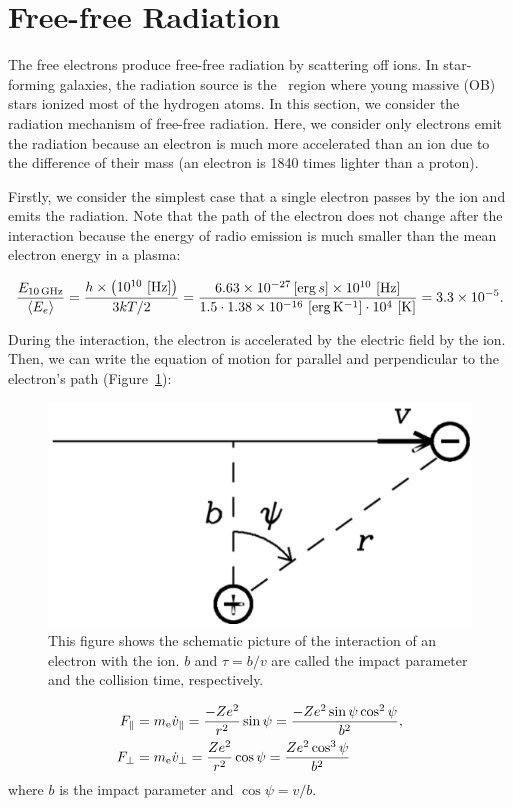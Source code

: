 \section{Free-free Radiation}\label{sec:freefreeradiation}

The free electrons produce free-free radiation by scattering off ions.
In star-forming galaxies, the radiation source is the \ih~region where young massive (OB) stars ionized most of the hydrogen atoms.
In this section, we consider the radiation mechanism of free-free radiation.
Here, we consider only electrons emit the radiation because an electron is much more accelerated than an ion due to the difference of their mass (an electron is 1840 times lighter than a proton).

Firstly, we consider the simplest case that a single electron passes by the ion and emits the radiation.
Note that the path of the electron does not change after the interaction because the energy of radio emission is much smaller than the mean electron energy in a plasma:

\begin{equation}\label{eq:essential_radio4n12}
    \frac{E_{\mathrm{10\,\mathrm{GHz}}}}{\left\langle E_e\right\rangle} = \frac{h \times \left(10^{10}\,\left[\mathrm{Hz}\right]\right)}{3kT / 2} = \frac{6.63 \times 10^{-27} \left[\mathrm{erg}\,s\right] \times 10^{10}\,\left[\mathrm{Hz}\right]}{1.5 \cdot 1.38 \times 10^{-16}\,\left[\mathrm{erg\,K^{-1}}\right] \cdot 10^4\,\left[\mathrm{K}\right]} = 3.3 \times 10^{-5}.
\end{equation}

During the interaction, the electron is accelerated by the electric field by the ion.
Then, we can write the equation of motion for parallel and perpendicular to the electron's path (Figure~\ref{fig:nrao_radio4n2}):

\begin{figure}[htbp]
	\centering
	\includegraphics[width=.5\linewidth]{Chapter_2/Figures/NRAO_radio4n2.png}
    \caption[The schematic image of the interaction of an electron with the ion]{\label{fig:nrao_radio4n2}
        This figure shows the schematic picture of the interaction of an electron with the ion.
        $b$ and $\tau = b/v$ are called the impact parameter and the collision time, respectively.
    }
\end{figure}
\begin{align}
    F_{\|} &= m_{\mathrm{e}} \dot{v}_{\|}=\frac{-Z e^{2}}{r^{2}} \sin \psi=\frac{-Z e^{2} \sin \psi \cos ^{2} \psi}{b^{2}},\label{eq:essential_radio4n15}\\
    F_{\perp} &= m_{\mathrm{e}} \dot{v}_{\perp}=\frac{Z e^{2}}{r^{2}} \cos \psi=\frac{Z e^{2} \cos ^{3} \psi}{b^{2}}\label{eq:essential_radio4n16}
\end{align}
where $b$ is the impact parameter and $\cos\psi = v/b$.


